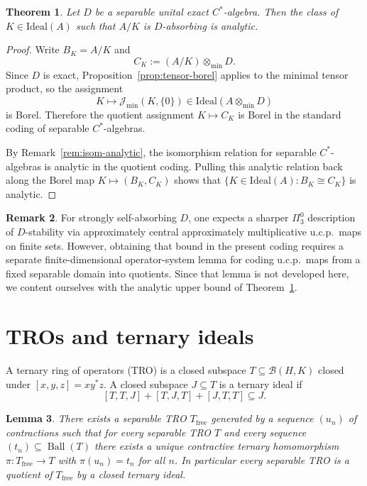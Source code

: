 \documentclass[12pt,fleqn,a4paper]{amsart}
\numberwithin{equation}{section}
\newtheorem{theorem}{Theorem}[section]
\newtheorem{lemma}[theorem]{Lemma}
\theoremstyle{definition}
\newtheorem{remark}[theorem]{Remark}
\newcommand{\Ideal}{\mathrm{Ideal}}
\begin{document}
\begin{theorem}\label{thm:Dstab}
Let $D$ be a separable unital exact $C^*$-algebra.
Then the class of $K\in\Ideal(A)$ such that $A/K$ is $D$-absorbing is analytic.
\end{theorem}

\begin{proof}
Write $B_K=A/K$ and
\[
C_K:=(A/K)\otimes_{\min} D.
\]
Since $D$ is exact, Proposition~\ref{prop:tensor-borel} applies to the minimal tensor
product, so the assignment
\[
K\longmapsto \mathcal J_{\min}(K,\{0\})\in \Ideal(A\otimes_{\min} D)
\]
is Borel. Therefore the quotient assignment $K\mapsto C_K$ is Borel in the standard
coding of separable $C^*$-algebras.

By Remark~\ref{rem:isom-analytic}, the isomorphism relation for separable $C^*$-algebras
is analytic in the quotient coding. Pulling this analytic relation back along the Borel
map
$K\mapsto (B_K,C_K)$
shows that
$\{K\in\Ideal(A): B_K\cong C_K\}$
is analytic.
\end{proof}

\begin{remark}\label{rem:Dstab-SSA}
For strongly self-absorbing $D$, one expects a sharper $\Pi^0_3$ description of
$D$-stability via approximately central approximately multiplicative u.c.p.\ maps
on finite sets.
However, obtaining that bound in the present coding requires a separate
finite-dimensional operator-system lemma for coding u.c.p.\ maps from a fixed
separable domain into quotients.
Since that lemma is not developed here, we content ourselves with the analytic
upper bound of Theorem~\ref{thm:Dstab}.
\end{remark}

\section{TROs and ternary ideals}\label{sec:TRO}

A ternary ring of operators (TRO) is a closed subspace
$T\subseteq\mathcal B(H,K)$ closed under $[x,y,z]=xy^*z$.
A closed subspace $J\subseteq T$ is a ternary ideal if
\[
    [T,T,J]+[T,J,T]+[J,T,T]\subseteq J.
\]

\begin{lemma}\label{lem:freeTRO}
There exists a separable TRO $T_{\mathrm{free}}$ generated by a sequence
$(u_n)$ of contractions such that for every separable TRO $T$ and every
sequence $(t_n)\subseteq \operatorname{Ball}(T)$ there exists a unique
contractive ternary homomorphism
$\pi:T_{\mathrm{free}}\to T$
with $\pi(u_n)=t_n$ for all $n$.
In particular every separable TRO is a quotient of $T_{\mathrm{free}}$ by a
closed ternary ideal.
\end{lemma}
\end{document}
